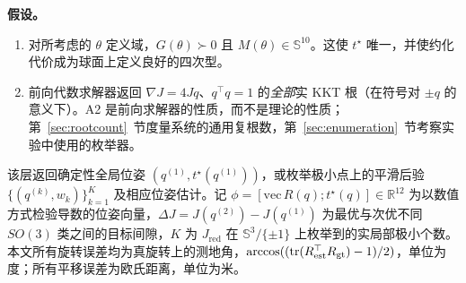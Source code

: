 \textbf{假设。}
\begin{enumerate}
\item[(A1)] 对所考虑的 $\theta$ 定义域，$G(\theta)\succ0$ 且 $M(\theta)\in\mathbb{S}^{10}$。这使 $t^\star$ 唯一，并使约化代价成为球面上定义良好的四次型。
\item[(A2)] 前向代数求解器返回 $\nabla J=4Jq$、$q^\top q=1$ 的\emph{全部}实 KKT 根（在符号对 $\pm q$ 的意义下）。A2 是前向求解器的性质，而不是理论的性质；第~\ref{sec:rootcount}~节度量系统的通用复根数，第~\ref{sec:enumeration}~节考察实验中使用的枚举器。
\end{enumerate}

该层返回确定性全局位姿 $(q^{(1)},t^\star(q^{(1)}))$，或枚举极小点上的平滑后验 $\{(q^{(k)},w_k)\}_{k=1}^{K}$ 及相应位姿估计。记 $\phi=[\mathrm{vec}\,R(q);t^\star(q)]\in\mathbb{R}^{12}$ 为以数值方式检验导数的位姿向量，$\Delta J=J(q^{(2)})-J(q^{(1)})$ 为最优与次优不同 $SO(3)$ 类之间的目标间隙，$K$ 为 $J_{\mathrm{red}}$ 在 $\mathbb{S}^3/\{\pm1\}$ 上枚举到的实局部极小个数。本文所有旋转误差均为真旋转上的测地角，$\arccos((\operatorname{tr}(R_{\rm est}^\top R_{\rm gt})-1)/2)$，单位为度；所有平移误差为欧氏距离，单位为米。
